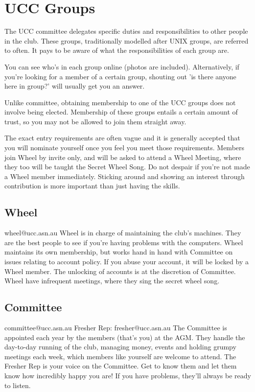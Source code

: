 \chapter{UCC Groups}



The UCC committee delegates specific duties and responsibilities to other people in the club. These groups, traditionally modelled after UNIX groups, are referred to often. It pays to be aware of what the responsibilities of each group are.


You can see who's in each group online (photos are included). Alternatively, if you're looking for a member of a certain group, shouting out 'is there anyone here in group?' will usually get you an answer.


Unlike committee, obtaining membership to one of the UCC groups does not involve being elected. Membership of these groups entails a certain amount of trust, so you may not be allowed to join them straight away.

The exact entry requirements are often vague and it is generally accepted that you will nominate yourself once you feel you meet those requirements. Members join Wheel by invite only, and will be asked to attend a Wheel Meeting, where they too will be taught the Secret Wheel Song.
Do not despair if you're not made a Wheel member immediately. Sticking around and showing an interest through contribution is more important than just having the skills.



\section{Wheel}
wheel@ucc.asn.au
Wheel is in charge of maintaining the club's machines. They are the best people to see if you're having problems with the computers. Wheel maintains its own membership, but works hand in hand with Committee on issues relating to account policy. If you abuse your account, it will be locked by a Wheel member. The unlocking of accounts is at the discretion of Committee. Wheel have infrequent meetings, where they sing the secret wheel song.

\section{Committee}
committee@ucc.asn.au
Fresher Rep: fresher@ucc.asn.au
The Committee is appointed each year by the members (that's you) at the AGM. They handle the day-to-day running of the club, managing money, events and holding grumpy meetings each week, which members like yourself are welcome to attend.
The Fresher Rep is your voice on the Committee. Get to know them and let them know how incredibly happy you are! If you have problems, they'll always be ready to listen.

